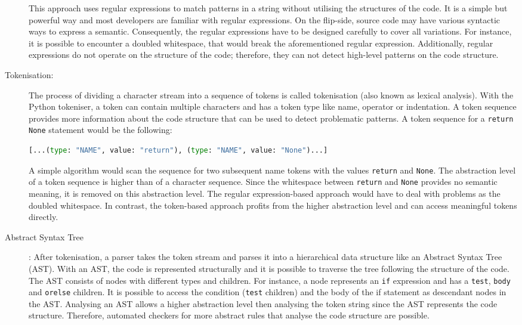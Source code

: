 \begin{description}
    This approach uses regular expressions to match patterns in a string without utilising the structures of the code. It is a simple but powerful way and most developers are familiar with regular expressions. On the flip-side, source code may have various syntactic ways to express a semantic. Consequently, the regular expressions have to be designed carefully to cover all variations. For instance, it is possible to encounter a doubled whitespace, that would break the aforementioned regular expression. Additionally, regular expressions do not operate on the structure of the code; therefore, they can not detect high-level patterns on the code structure.
    \item[Tokenisation:] The process of dividing a character stream into a sequence of tokens is called tokenisation (also known as lexical analysis). With the Python tokeniser, a token can contain multiple characters and has a token type like name, operator or indentation. A token sequence provides more information about the code structure that can be used to detect problematic patterns. 
    A token sequence for a \texttt{return None} statement would be the following: 
    \begin{lstlisting}[language=Python]
[...(type: "NAME", value: "return"), (type: "NAME", value: "None")...]\end{lstlisting}
    A simple algorithm would scan the sequence for two subsequent name tokens with the values \texttt{return} and \texttt{None}. The abstraction level of a token sequence is higher than of a character sequence. Since the whitespace between \texttt{return} and \texttt{None} provides no semantic meaning, it is removed on this abstraction level. The regular expression-based approach would have to deal with problems as the doubled whitespace. In contrast, the token-based approach profits from the higher abstraction level and can access meaningful tokens directly.
    \item[Abstract Syntax Tree]: After tokenisation, a parser takes the token stream and parses it into a hierarchical data structure like an Abstract Syntax Tree (AST). With an AST, the code is represented structurally and it is possible to traverse the tree following the structure of the code. The AST consists of nodes with different types and children. For instance, a node represents an \texttt{if} expression and has a \texttt{test}, \texttt{body} and \texttt{orelse} children. It is possible to access the condition (\texttt{test} children) and the body of the if statement as descendant nodes in the AST. Analysing an AST allows a higher abstraction level then analysing the token string since the AST represents the code structure. Therefore, automated checkers for more abstract rules that analyse the code structure are possible.


\end{description}
